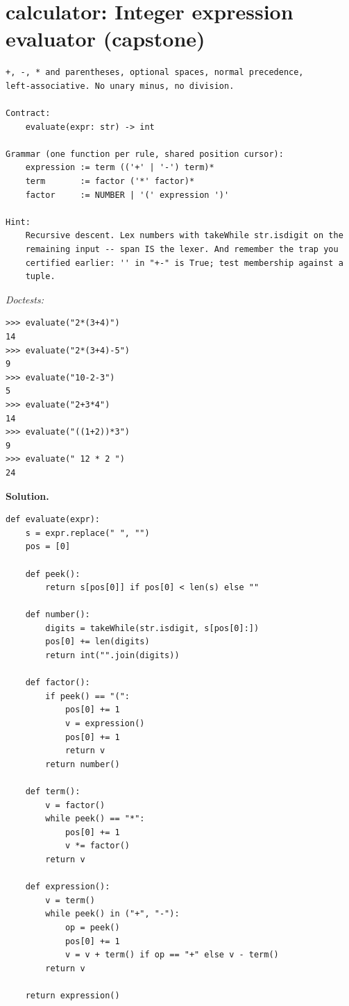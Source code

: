 \documentclass[11pt,letterpaper]{book}
\begin{document}
\section{calculator: Integer expression evaluator (capstone)}
\begin{lstlisting}[style=spec]
+, -, * and parentheses, optional spaces, normal precedence,
left-associative. No unary minus, no division.

Contract:
    evaluate(expr: str) -> int

Grammar (one function per rule, shared position cursor):
    expression := term (('+' | '-') term)*
    term       := factor ('*' factor)*
    factor     := NUMBER | '(' expression ')'

Hint:
    Recursive descent. Lex numbers with takeWhile str.isdigit on the
    remaining input -- span IS the lexer. And remember the trap you
    certified earlier: '' in "+-" is True; test membership against a
    tuple.
\end{lstlisting}
\noindent\textit{Doctests:}
\begin{lstlisting}[style=spec]
>>> evaluate("2*(3+4)")
14
>>> evaluate("2*(3+4)-5")
9
>>> evaluate("10-2-3")
5
>>> evaluate("2+3*4")
14
>>> evaluate("((1+2))*3")
9
>>> evaluate(" 12 * 2 ")
24
\end{lstlisting}
\noindent\textbf{Solution.}
\begin{lstlisting}[style=code]
def evaluate(expr):
    s = expr.replace(" ", "")
    pos = [0]

    def peek():
        return s[pos[0]] if pos[0] < len(s) else ""

    def number():
        digits = takeWhile(str.isdigit, s[pos[0]:])
        pos[0] += len(digits)
        return int("".join(digits))

    def factor():
        if peek() == "(":
            pos[0] += 1
            v = expression()
            pos[0] += 1
            return v
        return number()

    def term():
        v = factor()
        while peek() == "*":
            pos[0] += 1
            v *= factor()
        return v

    def expression():
        v = term()
        while peek() in ("+", "-"):
            op = peek()
            pos[0] += 1
            v = v + term() if op == "+" else v - term()
        return v

    return expression()
\end{lstlisting}
\end{document}
